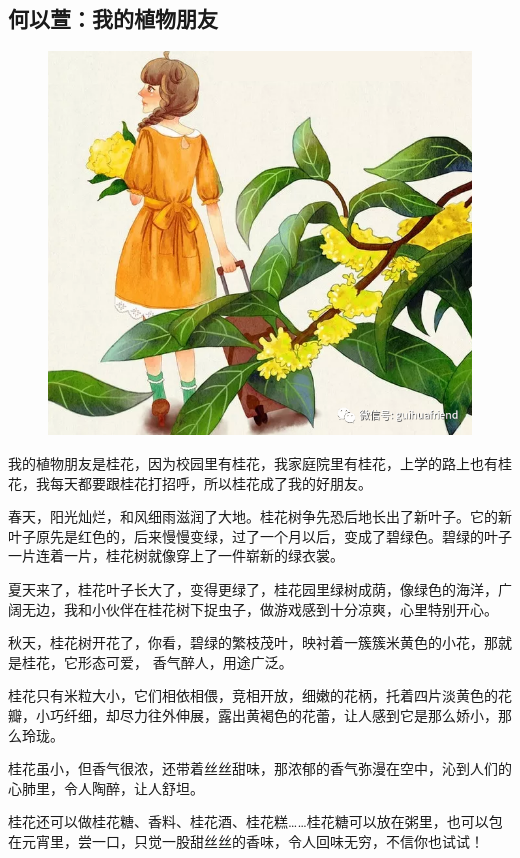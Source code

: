 \vspace{10pt}

{\centering\subsection*{何以萱：我的植物朋友}}


\renewcommand{\leftmark}{何以萱：我的植物朋友}

\begin{figure}[htbp]

\centering

\includegraphics[width = .5\textwidth]{./ch/20.jpg}

\end{figure}



我的植物朋友是桂花，因为校园里有桂花，我家庭院里有桂花，上学的路上也有桂花，我每天都要跟桂花打招呼，所以桂花成了我的好朋友。

春天，阳光灿烂，和风细雨滋润了大地。桂花树争先恐后地长出了新叶子。它的新叶子原先是红色的，后来慢慢变绿，过了一个月以后，变成了碧绿色。碧绿的叶子一片连着一片，桂花树就像穿上了一件崭新的绿衣裳。

夏天来了，桂花叶子长大了，变得更绿了，桂花园里绿树成荫，像绿色的海洋，广阔无边，我和小伙伴在桂花树下捉虫子，做游戏感到十分凉爽，心里特别开心。

秋天，桂花树开花了，你看，碧绿的繁枝茂叶，映衬着一簇簇米黄色的小花，那就是桂花，它形态可爱， 香气醉人，用途广泛。

桂花只有米粒大小，它们相依相偎，竞相开放，细嫩的花柄，托着四片淡黄色的花瓣，小巧纤细，却尽力往外伸展，露出黄褐色的花蕾，让人感到它是那么娇小，那么玲珑。

桂花虽小，但香气很浓，还带着丝丝甜味，那浓郁的香气弥漫在空中，沁到人们的心肺里，令人陶醉，让人舒坦。

桂花还可以做桂花糖、香料、桂花酒、桂花糕……桂花糖可以放在粥里，也可以包在元宵里，尝一口，只觉一股甜丝丝的香味，令人回味无穷，不信你也试试！





